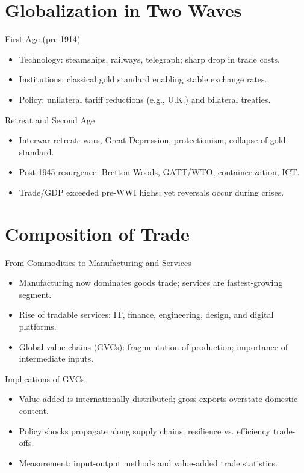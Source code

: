 \documentclass{beamer}
\begin{document}
\section{Globalization in Two Waves}
\begin{frame}{First Age (pre-1914)}
\begin{itemize}
  \item Technology: steamships, railways, telegraph; sharp drop in trade costs.
  \item Institutions: classical gold standard enabling stable exchange rates.
  \item Policy: unilateral tariff reductions (e.g., U.K.) and bilateral treaties.
\end{itemize}
\end{frame}

\begin{frame}{Retreat and Second Age}
\begin{itemize}
  \item Interwar retreat: wars, Great Depression, protectionism, collapse of gold standard.
  \item Post-1945 resurgence: Bretton Woods, GATT/WTO, containerization, ICT.
  \item Trade/GDP exceeded pre-WWI highs; yet reversals occur during crises.
\end{itemize}
\end{frame}

\section{Composition of Trade}
\begin{frame}{From Commodities to Manufacturing and Services}
\begin{itemize}
  \item Manufacturing now dominates goods trade; services are fastest-growing segment.
  \item Rise of tradable services: IT, finance, engineering, design, and digital platforms.
  \item Global value chains (GVCs): fragmentation of production; importance of intermediate inputs.
\end{itemize}
\end{frame}

\begin{frame}{Implications of GVCs}
\begin{itemize}
  \item Value added is internationally distributed; gross exports overstate domestic content.
  \item Policy shocks propagate along supply chains; resilience vs. efficiency trade-offs.
  \item Measurement: input-output methods and value-added trade statistics.
\end{itemize}
\end{frame}
\end{document}
